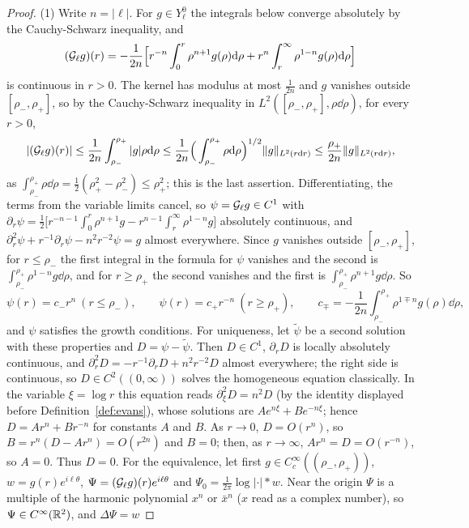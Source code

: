 \begin{proof}
(1) Write $n=|\ell|$. For $g\in Y^0_\ell$ the integrals below converge absolutely
by the Cauchy-Schwarz inequality, and
\[
(\mathcal{G}_\ell g)(r)=-\frac1{2n}\Big[r^{-n}\int_0^r\rho^{n+1}g(\rho)\dd\rho+r^{n}\int_r^\infty\rho^{1-n}g(\rho)\dd\rho\Big]
\]
is continuous in $r>0$. The kernel has modulus at most $\frac1{2n}$ and $g$
vanishes outside $[\rho_-,\rho_+]$, so by the Cauchy-Schwarz inequality in
$L^2([\rho_-,\rho_+],\rho\dd\rho)$, for every $r>0$,
\[
|(\mathcal{G}_\ell g)(r)|\le\frac1{2n}\int_{\rho_-}^{\rho_+}|g|\rho\dd\rho
\le\frac1{2n}\Big(\int_{\rho_-}^{\rho_+}\rho\dd\rho\Big)^{1/2}\|g\|_{L^2(r\dd r)}
\le\frac{\rho_+}{2n}\|g\|_{L^2(r\dd r)},
\]
as $\int_{\rho_-}^{\rho_+}\rho\dd\rho=\frac12(\rho_+^2-\rho_-^2)\le\rho_+^2$;
this is the last assertion. Differentiating, the terms from the variable limits
cancel, so $\psi=\mathcal{G}_\ell g\in C^1$ with
$\partial_r\psi=\frac12\big[r^{-n-1}\int_0^r\rho^{n+1}g-r^{n-1}\int_r^\infty\rho^{1-n}g\big]$
absolutely continuous, and $\partial_r^2\psi+r^{-1}\partial_r\psi-n^2r^{-2}\psi=g$ almost everywhere.
Since $g$ vanishes outside $[\rho_-,\rho_+]$, for $r\le\rho_-$ the first integral in
the formula for $\psi$ vanishes and the second is $\int_{\rho_-}^{\rho_+}\rho^{1-n}g\dd\rho$,
and for $r\ge\rho_+$ the second vanishes and the first is
$\int_{\rho_-}^{\rho_+}\rho^{n+1}g\dd\rho$. So
\[
\psi(r)=c_-r^n\ (r\le\rho_-),\qquad \psi(r)=c_+r^{-n}\ (r\ge\rho_+),\qquad
c_\mp=-\frac1{2n}\int_{\rho_-}^{\rho_+}\rho^{1\mp n}g(\rho)\dd\rho ,
\]
and $\psi$ satisfies the growth conditions. For uniqueness, let $\tilde\psi$ be a
second solution with these properties and $D=\psi-\tilde\psi$. Then $D\in C^1$,
$\partial_rD$ is locally absolutely continuous, and $\partial_r^2D=-r^{-1}\partial_rD+n^2r^{-2}D$ almost everywhere;
the right side is continuous, so $D\in C^2((0,\infty))$ solves the homogeneous
equation classically. In the variable $\xi=\log r$ this equation reads
$\partial_\xi^2D=n^2D$ (by the identity displayed before
Definition~\ref{def:evans}), whose solutions are $Ae^{n\xi}+Be^{-n\xi}$; hence
$D=Ar^n+Br^{-n}$ for constants $A$ and $B$. As $r\to0$, $D=O(r^n)$, so
$B=r^n(D-Ar^n)=O(r^{2n})$ and $B=0$; then, as $r\to\infty$, $Ar^n=D=O(r^{-n})$, so
$A=0$. Thus $D=0$. For the equivalence, let first $g\in C_c^\infty((\rho_-,\rho_+))$, $w=g(r)e^{i\ell\theta}$,
$\Psi=(\mathcal{G}_\ell g)(r)e^{i\ell\theta}$ and $\Psi_0=\frac1{2\pi}\log|\cdot|\ast w$.
Near the origin $\Psi$ is a multiple of the harmonic polynomial $x^n$ or $\bar
x^n$ ($x$ read as a complex number), so $\Psi\in C^\infty(\mathbb{R}^2)$, and $\Delta\Psi=w$

\end{proof}
